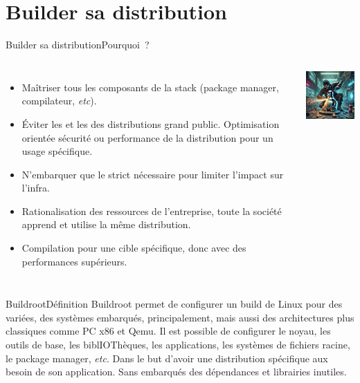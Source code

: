\documentclass{beamer}
\begin{document}
    \section{Builder sa distribution}\label{sec:build-distribution}
    \begin{frame}{Builder sa distribution}{Pourquoi~?}
        \begin{columns}
            \begin{itemize}
                \item Maîtriser tous les composants de la stack (package manager, compilateur, \textit{etc}).
                \item Éviter les  et les  des distributions grand public.
                Optimisation orientée sécurité ou performance de la distribution pour un usage spécifique.
                \item N'embarquer que le strict nécessaire pour limiter l'impact sur l'infra.
                \item Rationalisation des ressources de l'entreprise, toute la société apprend et utilise la même distribution.
                \item Compilation pour une cible spécifique, donc avec des performances supérieurs.
            \end{itemize}
            \centering
            \includegraphics[width=4cm]{image/building-linux}
        \end{columns}
    \end{frame}
    \begin{frame}{Buildroot}{Définition}
        Buildroot permet de configurer un build de Linux pour des  variées, des systèmes embarqués, principalement, mais aussi des architectures plus classiques comme PC x86 et Qemu.
        \bigbreak
        Il est possible de configurer le noyau, les outils de base, les biblIOThèques, les applications, les systèmes de fichiers racine, le package manager, \textit{etc}.
        Dans le but d'avoir une distribution spécifique aux besoin de son application.
        Sans embarqués des dépendances et librairies inutiles.
    \end{frame}
\end{document}
